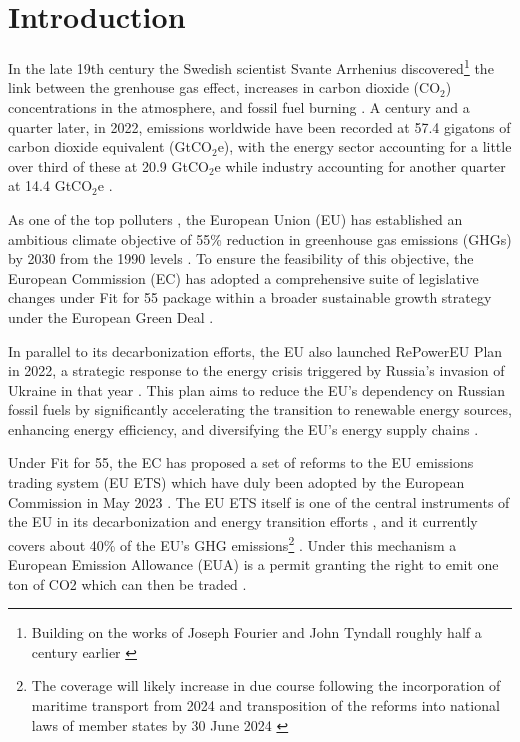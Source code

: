 \documentclass[preprint, 3p,
authoryear]{elsarticle} %
\begin{document}
\hypertarget{introduction}{%
\section{Introduction}\label{introduction}}

In the late 19th century the Swedish scientist Svante Arrhenius
discovered\footnote{Building on the works of Joseph Fourier and John Tyndall roughly half a century earlier \citep{corfee-morlot_global_2007}}
the link between the grenhouse gas effect, increases in carbon dioxide
(CO\(_2\)) concentrations in the atmosphere, and fossil fuel burning
\citep{corfee-morlot_global_2007, hart_scientific_1993, weart_discovery_2008}.
A century and a quarter later, in 2022, emissions worldwide have been
recorded at 57.4 gigatons of carbon dioxide equivalent (GtCO\(_2\)e),
with the energy sector accounting for a little over third of these at
20.9 GtCO\(_2\)e while industry accounting for another quarter at 14.4
GtCO\(_2\)e \citep{unep_emissions_2023}.

As one of the top polluters \citep{unep_emissions_2023}, the European
Union (EU) has established an ambitious climate objective of 55\%
reduction in greenhouse gas emissions (GHGs) by 2030 from the 1990
levels \citep[Art 4(1)]{regulation_2021_1119}. To ensure the feasibility
of this objective, the European Commission (EC) has adopted a
comprehensive suite of legislative changes under Fit for 55 package
within a broader sustainable growth strategy under the European Green
Deal \citep{delivering_2021}.

In parallel to its decarbonization efforts, the EU also launched
RePowerEU Plan in 2022, a strategic response to the energy crisis
triggered by Russia's invasion of Ukraine in that year
\citep{communication_2022}. This plan aims to reduce the EU's dependency
on Russian fossil fuels by significantly accelerating the transition to
renewable energy sources, enhancing energy efficiency, and diversifying
the EU's energy supply chains \citep[1-5]{communication_2022}.

Under Fit for 55, the EC has proposed a set of reforms to the EU
emissions trading system (EU ETS) which have duly been adopted by the
European Commission in May 2023 \citep{directive_2023_959}. The EU ETS
itself is one of the central instruments of the EU in its
decarbonization and energy transition efforts
\citep{decision_2015_1814, bai_drivers_2023}, and it currently covers
about 40\% of the EU's GHG
emissions\footnote{The coverage will likely increase in due course following the incorporation of maritime transport from 2024 and transposition of the reforms into national laws of member states by 30 June 2024 \citep{directive_2023_959}}
\citep{eu_ets}. Under this mechanism a European Emission Allowance (EUA)
is a permit granting the right to emit one ton of CO2 which can then be
traded \citep{directive_2003_87}.
\end{document}
